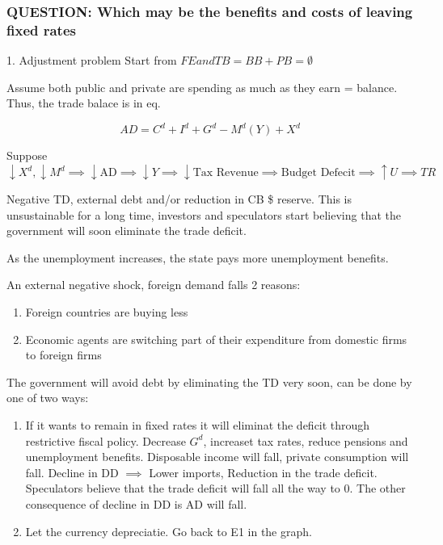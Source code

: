 \documentclass{report}
\begin{document}
\subsubsection*{QUESTION: Which may be the benefits and costs of leaving fixed rates}

1. Adjustment problem
Start from $FE and TB = BB + PB = \emptyset$

Assume both public and private are spending as much as they earn = balance. Thus, the trade balace is in eq. 

$$AD = C^d + I^d + G^d - M^d(Y) + X^d$$ 

Suppose $\downarrow X^d, \downarrow M^d \implies \downarrow \text{AD} \implies \downarrow Y \implies \downarrow \text{Tax Revenue} \implies \text{Budget Defecit} \implies \uparrow U \implies TR$

Negative TD, external debt and/or reduction in CB \$ reserve.
This is unsustainable for a long time, investors and speculators start believing that the government will soon eliminate the trade deficit. 

As the unemployment increases, the state pays more unemployment benefits. 

An external negative shock, foreign demand falls
2 reasons: 
\begin{enumerate}
    \item Foreign countries are buying less 
    \item Economic agents are switching part of their expenditure from domestic firms to foreign firms
\end{enumerate}


The government will avoid debt by eliminating the TD very soon, can be done by one of two ways:

\begin{enumerate}
    \item  If it wants to remain in fixed rates it will eliminat the deficit through restrictive fiscal policy. Decrease $G^d$, increaset tax rates, reduce pensions and unemployment benefits. Disposable income will fall, private consumption will fall. Decline in DD $\implies$ Lower imports, Reduction in the trade deficit. Speculators believe that the trade deficit will fall all the way to 0. 
	The other consequence of decline in DD is AD will fall. 
	
    \item Let the currency depreciatie. Go back to E1 in the graph.
\end{enumerate}
\end{document}
